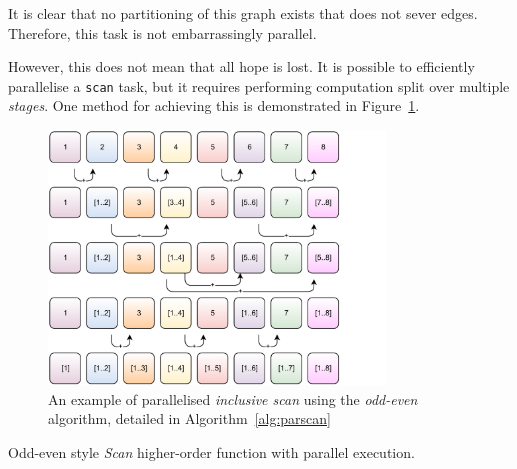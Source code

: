It is clear that no partitioning of this graph exists that does not sever edges. Therefore, this task is not embarrassingly parallel.

However, this does not mean that all hope is lost. It is possible to efficiently parallelise a \verb|scan| task, but it requires performing computation split over multiple \emph{stages}. One method for achieving this is demonstrated in Figure~\ref{fig:odd_even}.

\begin{figure}[h]
\begin{center}
  \includegraphics[width=0.8\textwidth]{./figures/oddeven.pdf}
  \caption{An example of parallelised \emph{inclusive scan} using the \emph{odd-even} algorithm, detailed in Algorithm~\ref{alg:parscan}}
  \label{fig:odd_even}
\end{center}
\end{figure}

\begin{algorithm}
  \caption{Odd-even style \emph{Scan} higher-order function with parallel execution.}
  \label{alg:parscan}

  \begin{algorithmic}

        \EndPFor
      \EndWhile

      \EndIf

        \EndPFor
      \EndWhile

    \EndFunction
  \end{algorithmic}
\end{algorithm}

